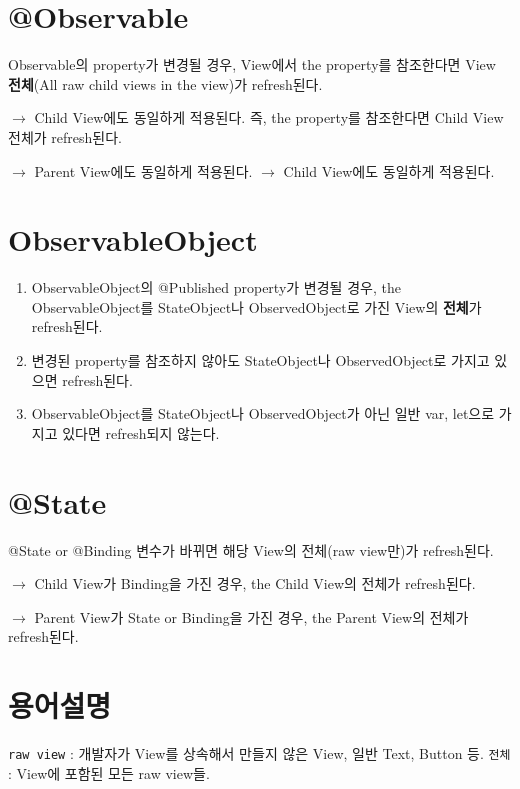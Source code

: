 \documentclass{article}
\begin{document}
   
\section{@Observable}
Observable의 property가 변경될 경우, View에서 the property를 참조한다면 View \textbf{전체}(All raw child views in the view)가 refresh된다.

$\rightarrow$ Child View에도 동일하게 적용된다. 즉, the property를 참조한다면 Child View 전체가 refresh된다.

$\rightarrow$ Parent View에도 동일하게 적용된다. $\rightarrow$ Child View에도 동일하게 적용된다.

\section{ObservableObject}
\begin{enumerate}
\item ObservableObject의 @Published property가 변경될 경우, the ObservableObject를 StateObject나 ObservedObject로 가진 View의 \textbf{전체}가 refresh된다.
\item 변경된 property를 참조하지 않아도 StateObject나 ObservedObject로 가지고 있으면 refresh된다.
\item ObservableObject를 StateObject나 ObservedObject가 아닌 일반 var, let으로 가지고 있다면 refresh되지 않는다.
\end{enumerate}

\section{@State}
@State or @Binding 변수가 바뀌면 해당 View의 전체(raw view만)가 refresh된다.

$\rightarrow$ Child View가 Binding을 가진 경우, the Child View의 전체가 refresh된다. 

$\rightarrow$ Parent View가 State or Binding을 가진 경우, the Parent View의 전체가 refresh된다. 

\section{용어설명}
\texttt{raw view} : 개발자가 View를 상속해서 만들지 않은 View, 일반 Text, Button 등.
\texttt{전체} : View에 포함된 모든 raw view들. 
\end{document}
